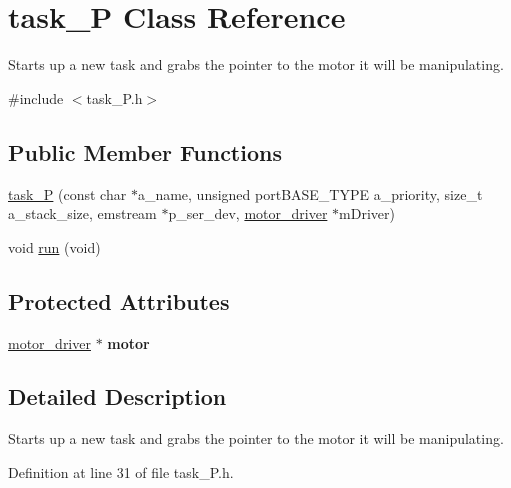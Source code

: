 \hypertarget{classtask__P}{\section{task\-\_\-\-P \-Class \-Reference}
\label{classtask__P}
}


\-Starts up a new task and grabs the pointer to the motor it will be manipulating.  




{\ttfamily \#include $<$task\-\_\-\-P.\-h$>$}

\subsection*{\-Public \-Member \-Functions}
\begin{DoxyCompactItemize}
\item 
\hyperlink{classtask__P_a57b4bbf00a14dcbc1597d90eb0ccada2}{task\-\_\-\-P} (const char $\ast$a\-\_\-name, unsigned port\-B\-A\-S\-E\-\_\-\-T\-Y\-P\-E a\-\_\-priority, size\-\_\-t a\-\_\-stack\-\_\-size, emstream $\ast$p\-\_\-ser\-\_\-dev, \hyperlink{classmotor__driver}{motor\-\_\-driver} $\ast$m\-Driver)
\item 
void \hyperlink{classtask__P_af315a71a8674a968c6169d44009ac3d4}{run} (void)
\end{DoxyCompactItemize}
\subsection*{\-Protected \-Attributes}
\begin{DoxyCompactItemize}
\item 
\hypertarget{classtask__P_ad692b5a39121ce63010e92540c0c5ab2}{\hyperlink{classmotor__driver}{motor\-\_\-driver} $\ast$ {\bfseries motor}}\label{classtask__P_ad692b5a39121ce63010e92540c0c5ab2}

\end{DoxyCompactItemize}


\subsection{\-Detailed \-Description}
\-Starts up a new task and grabs the pointer to the motor it will be manipulating. 

\-Definition at line 31 of file task\-\_\-\-P.\-h.



